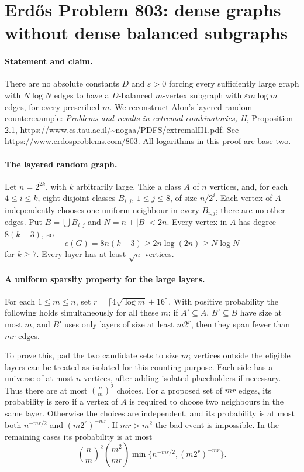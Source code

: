 \section*{Erd\H{o}s Problem 803: dense graphs without dense balanced subgraphs}

\paragraph{Statement and claim.}
There are no absolute constants \(D\) and \(\varepsilon>0\)
forcing every sufficiently large graph with \(N\log N\)
edges to have a \(D\)-balanced \(m\)-vertex subgraph with
\(\varepsilon m\log m\) edges, for every prescribed \(m\).
We reconstruct Alon's layered random counterexample:
\emph{Problems and results in extremal combinatorics, II},
Proposition 2.1,
\url{https://www.cs.tau.ac.il/~nogaa/PDFS/extremalII1.pdf}.
See \url{https://www.erdosproblems.com/803}.
All logarithms in this proof are base two.

\paragraph{The layered random graph.}
Let \(n=2^{2k}\), with \(k\) arbitrarily large.
Take a class \(A\) of \(n\) vertices, and, for each
\(4\leq i\leq k\), eight disjoint classes \(B_{i,j}\),
\(1\leq j\leq8\), of size \(n/2^i\).
Each vertex of \(A\) independently chooses one uniform
neighbour in every \(B_{i,j}\); there are no other edges.
Put \(B=\bigcup B_{i,j}\) and \(N=n+|B|<2n\).
Every vertex in \(A\) has degree \(8(k-3)\), so
\[
 e(G)=8n(k-3)\geq2n\log(2n)\geq N\log N
\]
for \(k\geq7\). Every layer has at least \(\sqrt n\) vertices.

\paragraph{A uniform sparsity property for the large layers.}
For each \(1\leq m\leq n\), set
\(r=\lceil4\sqrt{\log m}+16\rceil\).
With positive probability the following holds simultaneously
for all these \(m\): if \(A'\subseteq A\), \(B'\subseteq B\)
have size at most \(m\), and \(B'\) uses only layers of size
at least \(m2^r\), then they span fewer than \(mr\) edges.

To prove this, pad the two candidate sets to size \(m\);
vertices outside the eligible layers can be treated as
isolated for this counting purpose. Each side has a universe
of at most \(n\) vertices, after adding isolated placeholders
if necessary. Thus there are at most \(\binom nm^2\) choices.
For a proposed set of \(mr\) edges, its probability is zero
if a vertex of \(A\) is required to choose two neighbours
in the same layer. Otherwise the choices are independent,
and its probability is at most both \(n^{-mr/2}\) and
\((m2^r)^{-mr}\).
If \(mr>m^2\) the bad event is impossible.
In the remaining cases its probability is at most
\[
 \binom nm^2\binom{m^2}{mr}
 \min\{n^{-mr/2},(m2^r)^{-mr}\}.                               \tag{1}
\]

